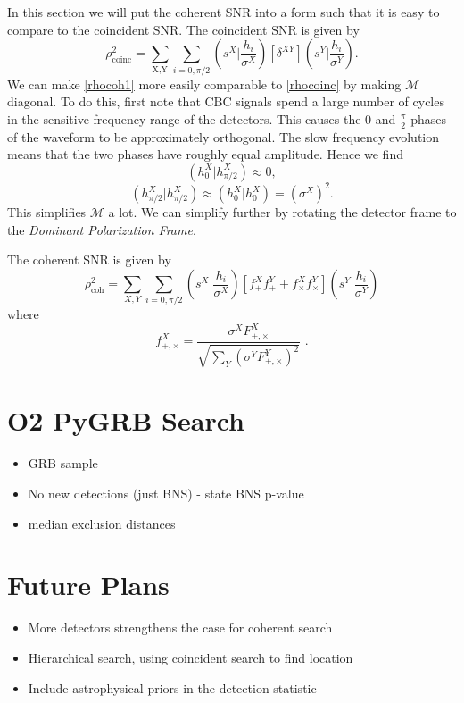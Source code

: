 \documentclass[12pt,twoside,a4paper]{report}
\begin{document}
In this section we will put the coherent SNR into a form such that it is easy to compare to the coincident SNR. The coincident SNR is given by
\begin{equation} \label{rhocoinc}
\rho^2_\text{coinc} = \sum_\text{X,Y} \sum_{i=0,\pi/2} \left( s^X \bigg| \frac{h_i}{\sigma^X} \right)[\delta^{XY}]\left( s^Y \bigg| \frac{h_i}{\sigma^Y} \right) \textbf{.}
\end{equation}
We can make \ref{rhocoh1} more easily comparable to \ref{rhocoinc} by making $\mathcal{M}$ diagonal. To do this, first note that CBC signals spend a large number of cycles in the sensitive frequency range of the detectors. This causes the $0$ and $\frac{\pi}{2}$ phases of the waveform to be approximately orthogonal. The slow frequency evolution means that the two phases have roughly equal amplitude. Hence we find 
\begin{equation}
(h_0^X|h_{\pi/2}^X)\approx 0 ,
\end{equation}
\begin{equation}
(h_{\pi/2}^X|h_{\pi/2}^X)\approx (h_0^X|h_0^X) = (\sigma^X)^2 \textbf{.}
\end{equation}
This simplifies $\mathcal{M}$ a lot. We can simplify further by rotating the detector frame to the \textit{Dominant Polarization Frame}. 

\newpage

The coherent SNR is given by
\begin{equation} \label{rhocoh}
\rho_\text{coh}^2 = \sum_{X,Y} \sum_{i=0,\pi/2} \left( s^X \bigg| \frac{h_i}{\sigma^X} \right) [f_+^X f_+^Y + f_\times^X f_\times^Y]  \left( s^Y \bigg| \frac{h_i}{\sigma^Y} \right)
\end{equation}
where 
\begin{equation}
f^X_{+,\times} = \frac{\sigma^X F^X_{+,\times}}{\sqrt{\sum_Y( \sigma^Y F^Y_{+,\times})^2}} \textbf{ .}
\end{equation}

\section{O2 PyGRB Search} 
\begin{itemize}
\item GRB sample
\item No new detections (just BNS) - state BNS p-value
\item median exclusion distances
\end{itemize}


\section{Future Plans}
\begin{itemize}
\item More detectors strengthens the case for coherent search
\item Hierarchical search, using coincident search to find location 
\item Include astrophysical priors in the detection statistic
\end{itemize}
\end{document}
